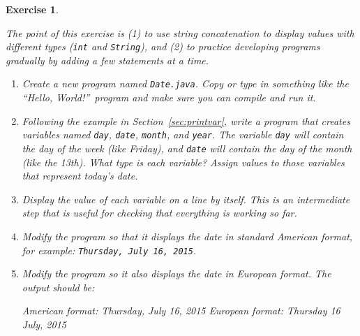 \documentclass[12pt]{book}
\theoremstyle{exercise}
\newtheorem{exercise}{Exercise}[chapter]
\newcommand{\java}[1]{\verb"#1"}
\begin{document}
\begin{exercise}
\label{ex:date}

The point of this exercise is (1) to use string concatenation to display values with different types (\java{int} and \java{String}), and (2) to practice developing programs gradually by adding a few statements at a time.

\begin{enumerate}

\item Create a new program named {\tt Date.java}.
Copy or type in something like the ``Hello, World!''\ program and make sure you can compile and run it.

\item Following the example in Section~\ref{sec:printvar}, write a program that creates variables named \java{day}, \java{date}, \java{month}, and \java{year}.
The variable \java{day} will contain the day of the week (like Friday), and \java{date} will contain the day of the month (like the 13th).
What type is each variable?
Assign values to those variables that represent today's date.

\item Display the value of each variable on a line by itself.
This is an intermediate step that is useful for checking that everything is working so far.

\item Modify the program so that it displays the date in standard American format, for example: {\tt Thursday, July 16, 2015}.

\item Modify the program so it also displays the date in European format.
The output should be:

\begin{stdout}
American format:
Thursday, July 16, 2015
European format:
Thursday 16 July, 2015
\end{stdout}

\end{enumerate}

\end{exercise}
\end{document}
